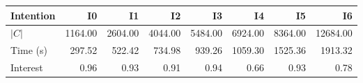\begin{tabular}{lrrrrrrr}
\toprule
Intention & I0 & I1 & I2 & I3 & I4 & I5 & I6 \\
\midrule
$|C|$ & 1164.00 & 2604.00 & 4044.00 & 5484.00 & 6924.00 & 8364.00 & 12684.00 \\
Time (s) & 297.52 & 522.42 & 734.98 & 939.26 & 1059.30 & 1525.36 & 1913.32 \\
Interest & 0.96 & 0.93 & 0.91 & 0.94 & 0.66 & 0.93 & 0.78 \\
\bottomrule
\end{tabular}
